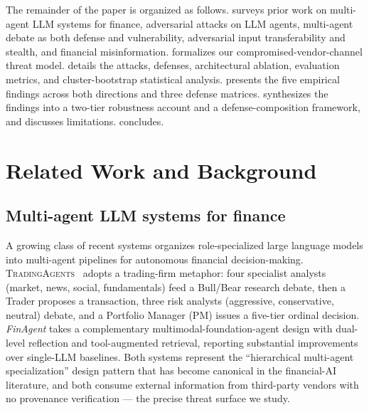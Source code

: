 \documentclass[10pt,letterpaper]{article}
\newcommand{\TA}{\textsc{TradingAgents}}
\begin{document}
The remainder of the paper is organized as follows.
 surveys prior work on multi-agent LLM systems for
finance, adversarial attacks on LLM agents, multi-agent debate as
both defense and vulnerability, adversarial input transferability
and stealth, and financial misinformation. 
formalizes our compromised-vendor-channel threat model.
 details the attacks, defenses, architectural
ablation, evaluation metrics, and cluster-bootstrap statistical
analysis.  presents the five empirical findings
across both directions and three defense matrices.
 synthesizes the findings into a two-tier
robustness account and a defense-composition framework, and
discusses limitations.  concludes.

\section{Related Work and Background}\label{sec:related}

\subsection{Multi-agent LLM systems for finance}\label{sec:related-finance}

A growing class of recent systems organizes role-specialized large
language models into multi-agent pipelines for autonomous financial
decision-making. \TA~\citep{xiao2024tradingagents} adopts a
trading-firm metaphor: four specialist analysts (market, news, social,
fundamentals) feed a Bull/Bear research debate, then a Trader proposes
a transaction, three risk analysts (aggressive, conservative, neutral)
debate, and a Portfolio Manager (PM) issues a five-tier ordinal
decision. \emph{FinAgent} \citep{zhang2024finagent} takes a
complementary multimodal-foundation-agent design with dual-level
reflection and tool-augmented retrieval, reporting substantial
improvements over single-LLM baselines. Both systems represent the
``hierarchical multi-agent specialization'' design pattern that has
become canonical in the financial-AI literature, and both consume
external information from third-party vendors with no provenance
verification --- the precise threat surface we study.
\end{document}
